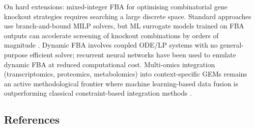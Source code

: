 \documentclass[11pt]{article}
\begin{document}
On hard extensions: mixed-integer FBA for optimising combinatorial gene 
knockout strategies requires searching a large discrete space. Standard approaches use 
branch-and-bound MILP solvers, but ML surrogate models trained on FBA 
outputs can accelerate screening of knockout combinations by orders of magnitude 
\cite{Zampieri2019,Sahu2021}. Dynamic FBA involves coupled ODE/LP systems 
with no general-purpose efficient solver; recurrent neural networks have been 
used to emulate dynamic FBA at reduced computational cost. Multi-omics integration 
(transcriptomics, proteomics, metabolomics) into context-specific GEMs remains 
an active methodological frontier where machine learning-based data fusion is 
outperforming classical constraint-based integration methods \cite{GonzalezFlux2023}.

\subsection*{References}
\end{document}
